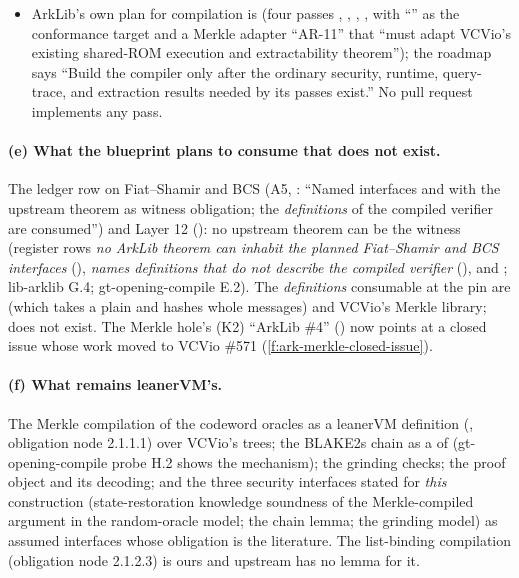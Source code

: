 \begin{itemize}
  proved commit-then-reveal completeness only.
\item ArkLib's own plan for compilation is 
  (four passes , , ,
  , with ``'' as the conformance target and a
  Merkle adapter ``AR-11'' that ``must adapt VCVio's existing shared-ROM execution and
  extractability theorem''); the roadmap says ``Build the compiler only after the ordinary
  security, runtime, query-trace, and extraction results needed by its passes exist.'' No pull
  request implements any pass.
\end{itemize}

\paragraph{(e) What the blueprint plans to consume that does not exist.}
The ledger row on Fiat--Shamir and BCS (A5, : ``Named interfaces
 and  with the upstream theorem as witness
obligation; the \emph{definitions} of the compiled verifier are consumed'') and Layer 12
(): no upstream theorem can be the witness (register rows \emph{no ArkLib
theorem can inhabit the planned Fiat--Shamir and BCS interfaces} (),
 \emph{names definitions that do not describe the compiled verifier}
(), and ; lib-arklib G.4; gt-opening-compile E.2). The \emph{definitions}
consumable at the pin are  (which takes a plain  and
hashes whole messages) and VCVio's Merkle library;  does not exist. The
Merkle hole's (K2) ``ArkLib \#4'' () now points at a closed issue whose work moved to
VCVio \#571 (\cref{f:ark-merkle-closed-issue}).

\paragraph{(f) What remains leanerVM's.}
The Merkle compilation of the codeword oracles as a leanerVM definition (,
obligation node 2.1.1.1) over VCVio's trees; the BLAKE2s chain as a  of
 (gt-opening-compile probe H.2 shows the mechanism); the grinding
checks; the proof object and its decoding; and the three security interfaces stated for
\emph{this} construction (state-restoration knowledge soundness of the Merkle-compiled argument
in the random-oracle model; the chain lemma; the grinding model) as assumed interfaces whose
obligation is the literature. The list-binding compilation (obligation node 2.1.2.3) is ours and
upstream has no lemma for it.


